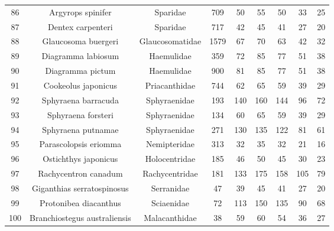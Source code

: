 \documentclass{report}\usepackage[]{graphicx}\usepackage[]{color}
\begin{document}
{\begin{longtable}{ccccccccc}
  86 & Argyrops spinifer & Sparidae & 709 & 50 & 55 & 50 & 33 & 25 \\ 
  87 & Dentex carpenteri & Sparidae & 717 & 42 & 45 & 41 & 27 & 20 \\ 
  88 & Glaucosoma buergeri & Glaucosomatidae & 1579 & 67 & 70 & 63 & 42 & 32 \\ 
  89 & Diagramma labiosum & Haemulidae & 359 & 72 & 85 & 77 & 51 & 38 \\ 
  90 & Diagramma pictum & Haemulidae & 900 & 81 & 85 & 77 & 51 & 38 \\ 
  91 & Cookeolus japonicus & Priacanthidae & 744 & 62 & 65 & 59 & 39 & 29 \\ 
  92 & Sphyraena barracuda & Sphyraenidae & 193 & 140 & 160 & 144 & 96 & 72 \\ 
  93 & Sphyraena forsteri & Sphyraenidae & 134 & 60 & 65 & 59 & 39 & 29 \\ 
  94 & Sphyraena putnamae & Sphyraenidae & 271 & 130 & 135 & 122 & 81 & 61 \\ 
  95 & Parascolopsis eriomma & Nemipteridae & 313 & 32 & 35 & 32 & 21 & 16 \\ 
  96 & Ostichthys japonicus & Holocentridae & 185 & 46 & 50 & 45 & 30 & 23 \\ 
  97 & Rachycentron canadum & Rachycentridae & 181 & 133 & 175 & 158 & 105 & 79 \\ 
  98 & Giganthias serratospinosus & Serranidae & 47 & 39 & 45 & 41 & 27 & 20 \\ 
  99 & Protonibea diacanthus & Sciaenidae & 72 & 113 & 150 & 135 & 90 & 68 \\ 
  100 & Branchiostegus australiensis & Malacanthidae & 38 & 59 & 60 & 54 & 36 & 27 \\ 
   \hline
\hline
\end{longtable}
}
 
\clearpage
\newpage
\end{document}
